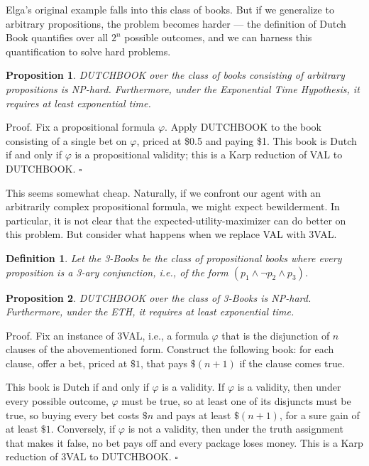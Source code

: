\documentclass[letterpaper,12pt]{article}
\renewcommand{\phi}{\varphi}
\newtheorem{definition}{Definition}
\newtheorem{proposition}{Proposition}
\begin{document}
Elga's original example falls into this class of books. But if we generalize to arbitrary propositions, the problem becomes harder --- the definition of Dutch Book quantifies over all $2^n$ possible outcomes, and we can harness this quantification to solve hard problems.

\begin{proposition}
\label{dutchBookNPHard}
DUTCHBOOK over the class of books consisting of arbitrary propositions is NP-hard. Furthermore, under the Exponential Time Hypothesis, it requires at least exponential time.
\end{proposition}

Proof. Fix a propositional formula $\phi$. Apply DUTCHBOOK to the book consisting of a single bet on $\phi$, priced at \$0.5 and paying \$1. This book is Dutch if and only if $\phi$ is a propositional validity; this is a Karp reduction of VAL to DUTCHBOOK. $\square$

This seems somewhat cheap. Naturally, if we confront our agent with an arbitrarily complex propositional formula, we might expect bewilderment. In particular, it is not clear that the expected-utility-maximizer can do better on this problem. But consider what happens when we replace VAL with 3VAL.

\begin{definition}
\label{3Book}
Let the \emph{3-Books} be the class of propositional books where every proposition is a 3-ary conjunction, i.e., of the form $(p_1 \land \neg p_2 \land p_3)$.
\end{definition}

\begin{proposition}
\label{dutch3BookNPHard}
DUTCHBOOK over the class of 3-Books is NP-hard. Furthermore, under the ETH, it requires at least exponential time.
\end{proposition}

Proof. Fix an instance of 3VAL, i.e., a formula $\phi$ that is the disjunction of $n$ clauses of the abovementioned form. Construct the following book: for each clause, offer a bet, priced at $\$1$, that pays $\$(n+1)$ if the clause comes true.

This book is Dutch if and only if $\phi$ is a validity. If $\phi$ is a validity, then under every possible outcome, $\phi$ must be true, so at least one of its disjuncts must be true, so buying every bet costs $\$n$ and pays at least $\$(n+1)$, for a sure gain of at least $\$1$. Conversely, if $\phi$ is not a validity, then under the truth assignment that makes it false, no bet pays off and every package loses money. This is a Karp reduction of 3VAL to DUTCHBOOK. $\square$
\end{document}
